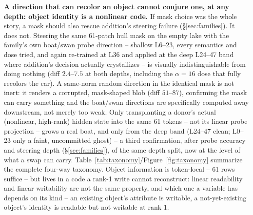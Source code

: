 \documentclass[10pt,twocolumn]{article}
\begin{document}
\textbf{A direction that can recolor an object cannot conjure one, at
any depth: object identity is a nonlinear code.} If mask choice was the
whole story, a mask should also rescue addition's steering failure
(\S\ref{sec:families}). It does not. Steering the same 61-patch hull
mask on the empty lake with the family's own boat/swan probe direction
-- shallow L6--23, every semantics and dose tried, and again re-trained
at L36 and applied at the deep L24--47 band where addition's decision
actually crystallizes -- is visually indistinguishable from doing
nothing (diff $2.4$--$7.5$ at both depths, including the $\alpha{=}16$
dose that fully recolors the car). A same-norm random direction in the
identical mask is not inert: it renders a corrupted, mask-shaped blob
(diff $51$--$87$), confirming the mask can carry something and the
boat/swan directions are specifically computed away downstream, not
merely too weak. Only transplanting a donor's actual (nonlinear,
high-rank) hidden state into the same 61 tokens -- not its linear probe
projection -- grows a real boat, and only from the deep band (L24--47
clean; L0--23 only a faint, uncommitted ghost) -- a third confirmation,
after probe accuracy and steering depth (\S\ref{sec:families}), of the
same depth split, now at the level of what a swap can carry.
Table~\ref{tab:taxonomy}/Figure~\ref{fig:taxonomy} summarize the
complete four-way taxonomy. Object information is token-local -- 61
rows suffice -- but lives in a code a rank-1 write cannot reconstruct:
linear readability and linear writability are not the same property, and
which one a variable has depends on its kind -- an existing object's
attribute is writable, a not-yet-existing object's identity is readable
but not writable at rank 1.
\end{document}
